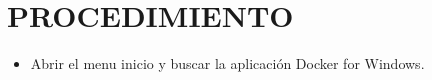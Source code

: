 \section{PROCEDIMIENTO} 

\begin{itemize}
\subsection{Parte 1: Iniciando Docker:}
	\item Abrir el menu inicio y buscar la aplicación Docker for Windows.
     
       
\end{itemize}
		